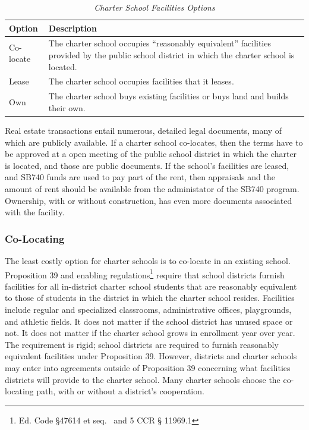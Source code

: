 \begin{table}[ht]
  \small%
  \caption[Charter School Facilities Options]{\textit{Charter School Facilities Options}}\label{tab:charter-facilities-options}%
  \begin{tabular}{ll}
    \toprule%
    Option    & Description \\
    \midrule%
    Co-locate & \multirow[t]{2}{4.75in}{The charter school occupies ``reasonably equivalent'' facilities provided by 
                the public school district in which the charter school is located.}\\
                \\
    Lease     & The charter school occupies facilities that it leases.\\
    Own       & The charter school buys existing facilities or buys land and builds their own. \\
    \bottomrule%
  \end{tabular}
\end{table}

Real estate transactions entail numerous, detailed legal documents, many of which are publicly available. If a charter school co-locates, then the terms have to be approved at a open meeting of the public school district in which the charter is located, and those are public documents. If the school's facilities are leased, and SB740 funds are used to pay part of the rent, then appraisals and the amount of rent should be available from the administator of the SB740 program. Ownership, with or without construction, has even more documents associated with the facility.

\subsubsection{Co-Locating}\label{sec:co-locating}\indent%

The least costly option for charter schools is to co-locate in an existing school. Proposition 39 and enabling regulations\footnote{Ed. Code §47614 et seq.  and 5 CCR § 11969.1} require that school districts furnish facilities for all in-district charter school students that are reasonably equivalent to those of students in the district in which the charter school resides. Facilities include regular and specialized classrooms, administrative offices, playgrounds, and athletic fields. It does not matter if the school district has unused space or not. It does not matter if the charter school grows in enrollment year over year. The requirement is rigid; school districts are required to furnish reasonably equivalent facilities under Proposition 39. However, districts and charter schools may enter into agreements outside of Proposition 39 concerning what facilities districts will provide to the charter school. Many charter schools choose the co-locating path, with or without a district's cooperation.


